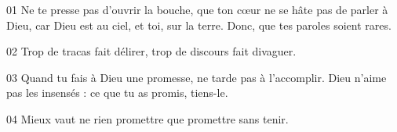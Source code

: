 01 Ne te presse pas d’ouvrir la bouche, que ton cœur ne se hâte pas de parler à Dieu, car Dieu est au ciel, et toi, sur la terre. Donc, que tes paroles soient rares.

02 Trop de tracas fait délirer, trop de discours fait divaguer.

03 Quand tu fais à Dieu une promesse, ne tarde pas à l’accomplir. Dieu n’aime pas les insensés : ce que tu as promis, tiens-le.

04 Mieux vaut ne rien promettre que promettre sans tenir.
